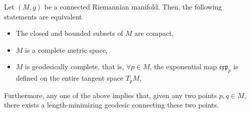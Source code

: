 \documentclass{homework}
\begin{document}
Let $(M,g)$ be a connected Riemannian manifold. Then, the following statements are equivalent

\begin{itemize}
    \item The closed and bounded subsets of $M$ are compact,
    \item $M$ is a complete metric space, 
    \item $M$ is geodesically complete, that is, $\forall p \in M$, the exponential map $\mathfrak{e}\mathfrak{x}\mathfrak{p}_{p}$ is defined on the entire tangent space $T_p M$,
\end{itemize}

Furthermore, any one of the above implies that, given any two points $p, q \in M$, there exists a length-minimizing geodesic connecting these two points. \\
\end{document}
